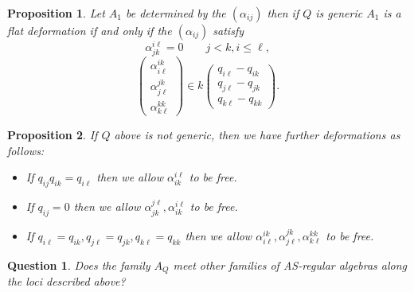 \documentclass{article}
\newtheorem{proposition}{Proposition}
\newtheorem{question}{Question}
\begin{document}
\begin{proposition}
  Let $A_1$ be determined by the $(\alpha_{ij})$ then if $Q$ is generic $A_1$ is a flat deformation if and only if the $(\alpha_{ij})$ satisfy
  $$ \alpha_{jk}^{i\ell} = 0 \quad \quad j < k, i \leq \ell,$$
$$\begin{pmatrix}
  \alpha^{ik}_{i\ell} \\ \alpha^{jk}_{j\ell} \\  \alpha^{kk}_{k\ell}
\end{pmatrix}
\in k
\begin{pmatrix}
  q_{i\ell} - q_{ik} \\ q_{j\ell} - q_{jk} \\ q_{k\ell} - q_{kk}
\end{pmatrix}.$$
\end{proposition}

\begin{proposition}
  If $Q$ above is not generic, then we have further deformations as follows:
  \begin{itemize}
    \item If $q_{ij}q_{ik} = q_{i\ell}$ then we allow $\alpha_{ik}^{i\ell} $ to be free.
    \item If $q_{ij} = 0$ then we allow $\alpha_{jk}^{j\ell}, \alpha_{ik}^{i\ell}$ to be free.
    \item If $q_{i\ell} = q_{ik},q_{j\ell} = q_{jk}, q_{k\ell} = q_{kk}$
      then we allow $\alpha^{ik}_{i\ell} , \alpha^{jk}_{j\ell} ,  \alpha^{kk}_{k\ell}$ to be free.
      \end{itemize}
\end{proposition}

\begin{question}
  Does the family $A_Q$ meet other families of AS-regular algebras along the loci described above?
  \end{question}
\end{document}
